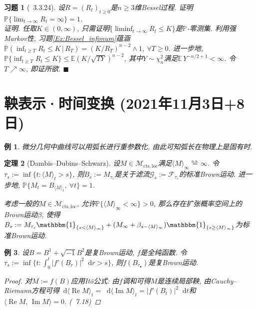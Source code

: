 \documentclass{ctexart}
\theoremstyle{definition}
\newtheorem{Def}{定义}[section]
\theoremstyle{remark}
\theoremstyle{plain}
\newtheorem{Thm}[Def]{定理}
\newtheorem{Eg}[Def]{例}
\newtheorem{Ex}{习题}[section]
\newenvironment{Prf}{\vspace{1ex}\textbf{\\}{\color{red}\textit{证明}}.\normalfont}{\color{red}\hfill$\blacksquare$\vspace{1ex}\par}
\newcommand{\1}{\mathbbm{1}}				%
\newcommand{\as}{\mathrm{a.s.}}				%
\renewcommand{\P}{\mathbb{P}}				%
\newcommand{\E}{\mathbb{E}}					%
\newcommand{\agp}[1]{\langle #1 \rangle}	%
\newcommand{\abs}[1]{\lvert#1\rvert}			%
\renewcommand{\Re}{\operatorname{Re}}		%
\renewcommand{\Im}{\operatorname{Im}}		%
\renewcommand*{\d}{\mathop{}\!\mathrm{d}}	%
\begin{document}
\begin{Ex}[\cite{Karatzas-Shreve--GTM113}~3.3.24]
设$R = (R_{t})_{t \ge 0}$是$n \ge 3$维Bessel过程. 证明$\P\{ \lim_{t\to\infty} R_{t} = \infty \} = 1$.
\begin{Prf}
任取$K \in (0,\infty)$, 只需证明$\{ \liminf_{t\to\infty} R_{t} \le K \}$是$\P$-零测集. 利用强Markov性, 习题\ref{Ex:Bessel_infimum}蕴涵$\P( \inf_{t \ge T} R_{t} \le K \,|\, R_{T} ) = (K/R_{T})^{n-2} \wedge 1$, $\forall T \ge 0$. 进一步地, $\P\{ \inf_{t \ge T} R_{t} \le K \} \le \E (K/\sqrt{TY})^{n-2}$, 其中$Y \sim \chi^{2}_{n}$满足$\E\, Y^{-n/2+1} < \infty$. 令$T \nearrow \infty$, 即证所欲.
\end{Prf}
\end{Ex}



\section{鞅表示·时间变换 \normalfont\footnotesize (2021年11月3日+8日)}
\begin{Eg}
微分几何中曲线可以用弧长进行重参数化, 由此可知弧长在物理上是固有时.
\end{Eg}


\begin{Thm}[Dambis--Dubins--Schwarz]\label{Thm:DDS}
设$M \in \mathcal{M}_{\mathrm{cts},\mathrm{loc}}$满足$\agp{M}_{\infty} \stackrel{\as}{=} \infty$. 令$\tau_{s} := \inf\{ t : \agp{M}_{t} > s \}$, 则$B_{s} := M_{\tau_{s}}$是关于滤流$\mathscr{G}_{s} := \mathscr{F}_{\tau_{s}}$的标准Brown运动. 进一步地, $\P\{ M_{t} = B_{\agp{M}_{t}} , \ \forall t \} = 1$. \par 考虑一般的$M \in \mathcal{M}_{\mathrm{cts},\mathrm{loc}}$, 允许$\P\{ \agp{M}_{\infty} < \infty \} > 0$, 那么存在扩张概率空间上的Brown运动$\beta$, 使得$B_{s} := M_{\tau_{s}}\1_{\{s<\agp{M}_{\infty}\}} + (M_{\infty}+\beta_{s-\agp{M}_{\infty}})\1_{\{s\ge\agp{M}_{\infty}\}}$为标准Brown运动.
\end{Thm}

\begin{Eg}
设$B = B^{1} + \sqrt{-1} B^{2}$是复Brown运动, $f$是全纯函数. 令$\tau_{s} := \inf\{ t : \int_{0}^{t} \abs{f'(B_{r})}^{2} \d r > s \}$, 则$f(B_{\tau_{\bullet}})$是复Brown运动.
\begin{proof}
对$M := f(B)$应用It\^{o}公式: 由$f$调和可得$M$是连续局部鞅, 由Cauchy--Riemann方程可得$\d\agp{\Re M}_{t} = \d\agp{\Im M}_{t} = \abs{f'(B_{t})}^{2} \d t$和$\agp{\Re M ,\, \Im M} = 0$. \quad\normalfont (\cite{LeGall--GTM274}~7.18)
\end{proof}
\end{Eg}
\end{document}
